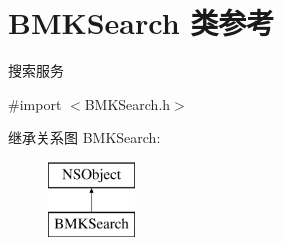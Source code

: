 \hypertarget{interface_b_m_k_search}{\section{B\-M\-K\-Search 类参考}
\label{interface_b_m_k_search}
}


搜索服务  




{\ttfamily \#import $<$B\-M\-K\-Search.\-h$>$}

继承关系图 B\-M\-K\-Search\-:\begin{figure}[H]
\begin{center}
\leavevmode
\includegraphics[height=2.000000cm]{interface_b_m_k_search}
\end{center}
\end{figure}

